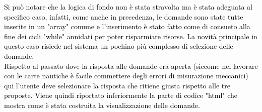 \textcolor{black}{Si può notare che la logica di fondo non è stata stravolta ma è stata adeguata al specifico caso, infatti, come anche in precedenza, le domande sono state tutte inserite in un "array" comune e l'inserimento è stato fatto come di consueto alla fine dei cicli "while" annidati per poter risparmiare risorse. La novità principale in questo caso risiede nel sistema un pochino più complesso di selezione delle domande.\\
Rispetto al passato dove la risposta alle domande era aperta (siccome nel lavorare con le carte nautiche è facile commettere degli errori di misurazione meccanici) qui l'utente deve selezionare la risposta che ritiene giusta rispetto alle tre proposte. Viene quindi riportato inferiormente la parte di codice "html" che mostra come è stata costruita la visualizzazione delle domande.}\\

